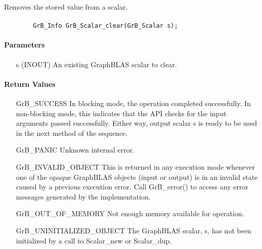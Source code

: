 Removes the stored value from a scalar.

\paragraph{\syntax}

\begin{verbatim}
        GrB_Info GrB_Scalar_clear(GrB_Scalar s);
\end{verbatim}

\paragraph{Parameters}

\begin{itemize}[leftmargin=1.1in]
    \item[{\sf s}] ({\sf INOUT}) An existing GraphBLAS scalar to clear.
\end{itemize}

\paragraph{Return Values}

\begin{itemize}[leftmargin=2.1in]
    \item[{\sf GrB\_SUCCESS}]         In blocking mode, the operation completed
    successfully. In non-blocking mode, this indicates that the API checks 
    for the input arguments passed successfully. Either way, output scalar 
    {\sf s} is ready to be used in the next method of the sequence.

    \item[{\sf GrB\_PANIC}]           Unknown internal error.
    
    \item[{\sf GrB\_INVALID\_OBJECT}] This is returned in any execution mode 
    whenever one of the opaque GraphBLAS objects (input or output) is in an invalid 
    state caused by a previous execution error.  Call {\sf GrB\_error()} to access 
    any error messages generated by the implementation.

    \item[{\sf GrB\_OUT\_OF\_MEMORY}] Not enough memory available for operation.
    
    \item[{\sf GrB\_UNINITIALIZED\_OBJECT}]  The GraphBLAS scalar, {\sf s}, has 
    not been initialized by a call to {\sf Scalar\_new} or {\sf Scalar\_dup}.
    
\end{itemize}


